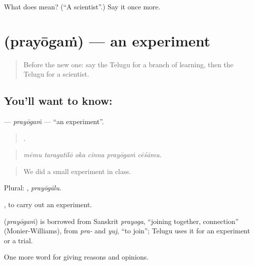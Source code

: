 \begin{tcolorbox}[breakable,colback=teal!4,colframe=teal!35!black,title={Before you move on}]
What does  mean? (\textquotedblleft{}A scientist\textquotedblright{}.) Say it once more.
\end{tcolorbox}
\section[\texorpdfstring{\te{ప్రయోగం} (prayōgaṁ)}{ప్రయోగం (prayōgaṁ)}]{ (prayōgaṁ) — an experiment}

\label{lesson:TE-C413-prayogam}



\begin{quote}
Before the new one: say the Telugu for a branch of learning, then the Telugu for a scientist.
\end{quote}

\subsection*{You'll want to know: }
\textbf{} — \emph{prayōgaṁ} — \textquotedblleft{}an experiment\textquotedblright{}.

\begin{quote}
     .
\end{quote}

\begin{quote}
\emph{mēmu taragatilō oka cinna prayōgaṁ cēśāmu.}
\end{quote}

\begin{quote}
We did a small experiment in class.
\end{quote}

Plural: , \emph{prayōgālu}.

 , to carry out an experiment.

\begin{cousinweb}
\textbf{} (\emph{prayōgaṁ}) is borrowed from Sanskrit \emph{prayoga}, \textquotedblleft{}joining together, connection\textquotedblright{} (Monier-Williams), from \emph{pra-} and \emph{yuj}, \textquotedblleft{}to join\textquotedblright{}; Telugu uses it for an experiment or a trial.
\end{cousinweb}

\begin{grammarlens}[title={What you've built}]
One more word for giving reasons and opinions.
\end{grammarlens}

